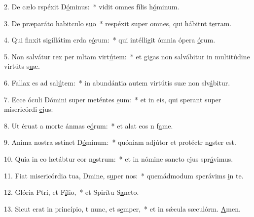 2. De cælo rspéxit D\uline{ó}minus:~* vidit omnes fílis h\uline{ó}minum.\par 
3. De præparáto habitculo s\uline{u}o~* respéxit super omnes, qui hábitnt t\uline{e}rram.\par 
4. Qui finxit sigillátim crda e\uline{ó}rum:~* qui intélligit ómnia ópera \uline{ó}rum.\par 
5. Non salvátur rex per mltam virt\uline{ú}tem:~* et gigas non salvábitur in multitúdine virtúts s\uline{u}æ.\par 
6. Fallax es ad sal\uline{ú}tem:~* in abundántia autem virtútis suæ non slv\uline{á}bitur.\par 
7. Ecce óculi Dómini super meténtes \uline{e}um:~* et in eis, qui sperant super misericórdi \uline{e}jus:\par 
8. Ut éruat a morte ánmas e\uline{ó}rum:~* et alat eos n f\uline{a}me.\par 
9. Anima nostra sstinet D\uline{ó}minum:~* quóniam adjútor et protéctr n\uline{o}ster est.\par 
10. Quia in eo lætábtur cor n\uline{o}strum:~* et in nómine sancto ejus spr\uline{á}vimus.\par 
11. Fiat misericórdia tua, Dmine, s\uline{u}per nos:~* quemádmodum sperávims \uline{i}n te.\par 
12. Glória Ptri, et F\uline{í}lio,~* et Spirítu S\uline{a}ncto.\par 
13. Sicut erat in princípio, t nunc, et s\uline{e}mper,~* et in sǽcula sæculórm. \uline{A}men.\par 
